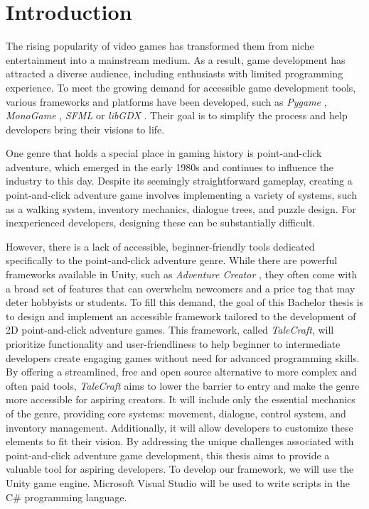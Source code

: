 \chapter{Introduction}
\label{Intro}

The rising popularity of video games has transformed them from niche entertainment into a mainstream medium. As a result, game development has attracted a diverse audience, including enthusiasts with limited programming experience. To meet the growing demand for accessible game development tools, various frameworks and platforms have been developed, such as \textit{Pygame} \cite{Pygame}, \textit{MonoGame} \cite{MonoGame}, \textit{SFML} \cite{SFML} or \textit{libGDX} \cite{libGDX}. Their goal is to simplify the process and help developers bring their visions to life.

One genre that holds a special place in gaming history is point-and-click adventure, which emerged in the early 1980s and continues to influence the industry to this day. Despite its seemingly straightforward gameplay, creating a point-and-click adventure game involves implementing a variety of systems, such as a walking system, inventory mechanics, dialogue trees, and puzzle design. For inexperienced developers, designing these can be substantially difficult.

However, there is a lack of accessible, beginner-friendly tools dedicated specifically to the point-and-click adventure genre. While there are powerful frameworks available in Unity, such as \textit{Adventure Creator} \cite{AdvCreator}, they often come with a broad set of features that can overwhelm newcomers and a price tag that may deter hobbyists or students. To fill this demand, the goal of this Bachelor thesis is to design and implement an accessible framework tailored to the development of 2D point-and-click adventure games. This framework, called \textit{TaleCraft}, will prioritize functionality and user-friendliness to help beginner to intermediate developers create engaging games without need for advanced programming skills. By offering a streamlined, free and open source alternative to more complex and often paid tools, \textit{TaleCraft} aims to lower the barrier to entry and make the genre more accessible for aspiring creators. It will include only the essential mechanics of the genre, providing core systems: movement, dialogue, control system, and inventory management. Additionally, it will allow developers to customize these elements to fit their vision. By addressing the unique challenges associated with point-and-click adventure game development, this thesis aims to provide a valuable tool for aspiring developers. To develop our framework, we will use the Unity game engine. Microsoft Visual Studio will be used to write scripts in the C\# programming language. 

